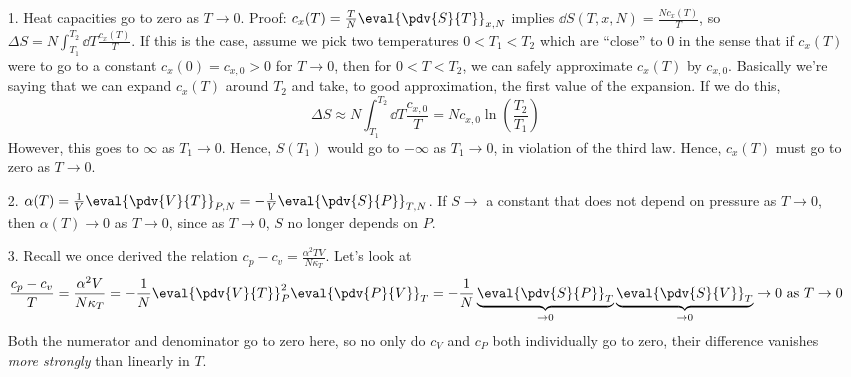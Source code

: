 \documentclass[a4paper,twoside,master.tex]{subfiles}
\begin{document}
\begin{itemize}
    \item[1.] Heat capacities go to zero as $ T \to 0 $.
        \subitem Proof: $ c_x(T) = \frac{T}{N} \eval{\pdv{S}{T}}_{x,N} $ implies $ \dd{S}(T,x,N) = \frac{N c_x(T)}{T} $, so $ \Delta S = N \int_{T_1}^{T_2} \dd{T} \frac{c_x(T)}{T} $. If this is the case, assume we pick two temperatures $ 0 < T_1 < T_2 $ which are ``close'' to $ 0 $ in the sense that if $ c_x(T) $ were to go to a constant $ c_x(0) = c_{x,0} > 0 $ for $ T \to 0 $, then for $ 0 < T < T_2 $, we can safely approximate $ c_x(T) $ by $ c_{x,0} $. Basically we're saying that we can expand $ c_x(T) $ around $ T_2 $ and take, to good approximation, the first value of the expansion. If we do this,
        \begin{equation}
            \Delta S \approx N \int_{T_1}^{T_2} \dd{T} \frac{c_{x,0}}{T} = N c_{x,0} \ln(\frac{T_2}{T_1})
        \end{equation}
        However, this goes to $ \infty $ as $ T_1 \to 0 $. Hence, $ S(T_1) $ would go to $ - \infty $ as $ T_1 \to 0 $, in violation of the third law. Hence, $ c_x(T) $ must go to zero as $ T \to 0 $.
    \item[2.] $ \alpha(T) = \frac{1}{V} \eval{\pdv{V}{T}}_{P,N} = - \frac{1}{V} \eval{\pdv{S}{P}}_{T,N} $. If $ S \to $ a constant that does not depend on pressure as $ T \to 0 $, then $ \alpha(T) \to 0 $ as $ T \to 0 $, since as $ T \to 0 $, $ S $ no longer depends on $ P $.
    \item[3.] Recall we once derived the relation $ c_p - c_v = \frac{\alpha^2 T V}{N \kappa_T} $. Let's look at 
        \begin{equation}
            \frac{c_p - c_v}{T} = \frac{\alpha^2 V}{N \kappa_T} = - \frac{1}{N} \eval{\pdv{V}{T}}_{P}^2 \eval{\pdv{P}{V}}_{T} = - \frac{1}{N} \underbrace{\eval{\pdv{S}{P}}_{T}}_{\to 0} \underbrace{\eval{\pdv{S}{V}}_{T}}_{\to 0} \to 0 \text{ as } T \to 0 
        \end{equation}
        Both the numerator and denominator go to zero here, so no only do $ c_V $ and $ c_P $ both individually go to zero, their difference vanishes \textit{more strongly} than linearly in $ T $.
\end{itemize}
\end{document}
